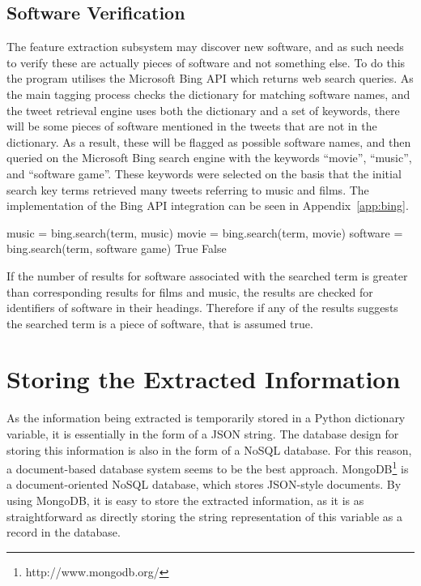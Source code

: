 \subsection{Software Verification}
\label{sec:bing}
The feature extraction subsystem may discover new software, and as such needs to verify these are actually pieces of software and not something else. To do this the program utilises the Microsoft Bing API which returns web search queries. As the main tagging process checks the dictionary for matching software names, and the tweet retrieval engine uses both the dictionary and a set of keywords, there will be some pieces of software mentioned in the tweets that are not in the dictionary. As a result, these will be flagged as possible software names, and then queried on the Microsoft Bing search engine with the keywords ``movie'', ``music'', and ``software game''. These keywords were selected on the basis that the initial search key terms retrieved many tweets referring to music and films. The implementation of the Bing API integration can be seen in Appendix~\ref{app:bing}.
\newline
\begin{algorithmic}
    \State music = bing.search(term, music)
    \State movie = bing.search(term, movie)
    \State software = bing.search(term, software game)
    \newline
            \State \Return True
        \EndIf
    \EndIf
    \newline
    \State \Return False
\EndFunction
\end{algorithmic}
If the number of results for software associated with the searched term is greater than corresponding results for films and music, the results are checked for identifiers of software in their headings. Therefore if any of the results suggests the searched term is a piece of software, that is assumed true.

\section{Storing the Extracted Information}
As the information being extracted is temporarily stored in a Python dictionary variable, it is essentially in the form of a JSON string. The database design for storing this information is also in the form of a NoSQL database. For this reason, a document-based database system seems to be the best approach. MongoDB\footnote{http://www.mongodb.org/} is a document-oriented NoSQL database, which stores JSON-style documents. By using MongoDB, it is easy to store the extracted information, as it is as straightforward as directly storing the string representation of this variable as a record in the database.

